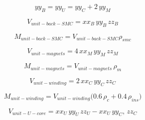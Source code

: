                     
                    \begin{equation}
                        yy_B = yy_U = yy_C + 2\,yy_M
                        \label{eq:chap/rsm/LTFM/mass/yyb is yyu}
                    \end{equation}
                
                
                    \begin{equation}
                        V_{unit-back-SMC} = xx_B\,yy_B\,zz_B
                        \label{eq:chap/rsm/LTFM/mass/V unit back smc}
                    \end{equation}
                    
                    
                    \begin{equation}
                        M_{unit-back-SMC} =  V_{unit-back-SMC} \rho_{smc}
                        \label{eq:chap/rsm/LTFM/mass/M unit back smc}
                    \end{equation}


                    \begin{equation}
                        V_{unit-magnets} = 4\,xx_M\,yy_M\,zz_M
                        \label{eq:chap/rsm/LTFM/mass/V unit 4 magnets}
                    \end{equation}
                    
                    
                    \begin{equation}
                        M_{unit-magnets} =  V_{unit-magnets}\,\rho_{m}
                        \label{eq:chap/rsm/LTFM/mass/M unit 4 magnets}
                    \end{equation}
                    
                    
                    \begin{equation}
                        V_{unit-winding} = 2\,xx_C\,yy_C\,zz_C
                        \label{eq:chap/rsm/LTFM/mass/V unit windings}
                    \end{equation}
                    
                    
                    \begin{equation}
                        M_{unit-winding} =  V_{unit-winding} \big( 0.6\,\rho_{c} + 0.4\,\rho_{ins} \big)
                        \label{eq:chap/rsm/LTFM/mass/M unit windings}
                    \end{equation}
                    
                    
                    \begin{equation}
                        V_{unit-U-core} = xx_U\,yy_U\,zz_U - xx_U\,yy_C,\,zz_C
                        \label{eq:chap/rsm/LTFM/mass/V unit U-core smc}
                    \end{equation}
                    

